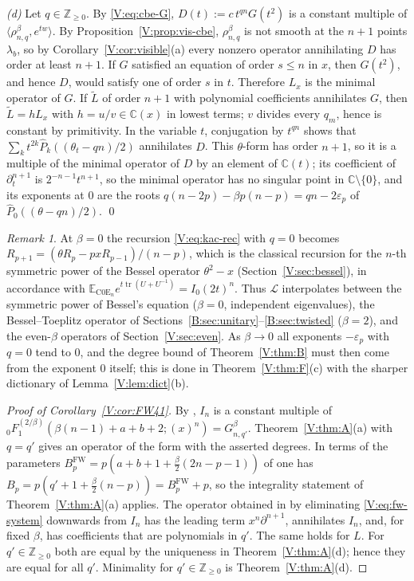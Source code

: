 \documentclass[11pt,a4paper]{article}
\theoremstyle{definition}
\theoremstyle{remark}
\newtheorem{remark}[theorem]{Remark}
\newcommand{\C}{\mathbb C}
\newcommand{\Z}{\mathbb Z}
\newcommand{\E}{\mathbb E}
\DeclareMathOperator{\tr}{tr}
\numberwithin{equation}{section}
\begin{document}
\emph{(d)} Let $q\in\Z_{\ge0}$. By \eqref{V:eq:cbe-G}, $D(t):=c\,t^{qn}G(t^2)$ is a constant multiple of $\langle\rho^\beta_{n,q},e^{tw}\rangle$. By Proposition~\ref{V:prop:vis-cbe}, $\rho^\beta_{n,q}$ is not smooth at the $n+1$ points $\lambda_b$, so by Corollary~\ref{V:cor:visible}(a) every nonzero operator annihilating $D$ has order at least $n+1$. If $G$ satisfied an equation of order $s\le n$ in $x$, then $G(t^2)$, and hence $D$, would satisfy one of order $s$ in $t$. Therefore $L_x$ is the minimal operator of $G$. If $\tilde L$ of order $n+1$ with polynomial coefficients annihilates $G$, then $\tilde L=hL_x$ with $h=u/v\in\C(x)$ in lowest terms; $v$ divides every $q_m$, hence is constant by primitivity. In the variable $t$, conjugation by $t^{qn}$ shows that $\sum_kt^{2k}\hat P_k((\theta_t-qn)/2)$ annihilates $D$. This $\theta$-form has order $n+1$, so it is a multiple of the minimal operator of $D$ by an element of $\C(t)$; its coefficient of $\partial_t^{n+1}$ is $2^{-n-1}t^{n+1}$, so the minimal operator has no singular point in $\C\setminus\{0\}$, and its exponents at $0$ are the roots $q(n-2p)-\beta p(n-p)=qn-2\varepsilon_p$ of $\hat P_0((\theta-qn)/2)$. \qed

\begin{remark}\label{V:rem:beta0}
At $\beta=0$ the recursion \eqref{V:eq:kac-rec} with $q=0$ becomes $R_{p+1}=(\theta R_p-pxR_{p-1})/(n-p)$, which is the classical recursion for the $n$-th symmetric power of the Bessel operator $\theta^2-x$ (Section~\ref{V:sec:bessel}), in accordance with $\E_{\mathrm{C}0\mathrm{E}_n}e^{t\tr(U+U^{-1})}=I_0(2t)^n$. Thus $\mathcal L$ interpolates between the symmetric power of Bessel's equation ($\beta=0$, independent eigenvalues), the Bessel--Toeplitz operator of Sections~\ref{B:sec:unitary}--\ref{B:sec:twisted} ($\beta=2$), and the even-$\beta$ operators of Section~\ref{V:sec:even}. As $\beta\to0$ all exponents $-\varepsilon_p$ with $q=0$ tend to $0$, and the degree bound of Theorem~\ref{V:thm:B} must then come from the exponent $0$ itself; this is done in Theorem~\ref{V:thm:F}(c) with the sharper dictionary of Lemma~\ref{V:lem:dict}(b).
\end{remark}

\begin{proof}[Proof of Corollary~\ref{V:cor:FW41}]
By \cite[(3.10)]{FW26}, $I_n$ is a constant multiple of ${}_0F_1^{(2/\beta)}(\beta(n-1)+a+b+2;(x)^n)=G^\beta_{n,q'}$. Theorem~\ref{V:thm:A}(a) with $q=q'$ gives an operator of the form \cite[(4.1)]{FW26} with the asserted degrees. In terms of the parameters $B^{\mathrm{FW}}_p=p(a+b+1+\frac\beta2(2n-p-1))$ of \cite[(3.3)]{FW26} one has $B_p=p(q'+1+\frac\beta2(n-p))=B^{\mathrm{FW}}_p+p$, so the integrality statement of Theorem~\ref{V:thm:A}(a) applies. The operator obtained in \cite[\S4.1]{FW26} by eliminating \eqref{V:eq:fw-system} downwards from $I_n$ has the leading term $x^n\partial^{n+1}$, annihilates $I_n$, and, for fixed $\beta$, has coefficients that are polynomials in $q'$. The same holds for $L$. For $q'\in\Z_{\ge0}$ both are equal by the uniqueness in Theorem~\ref{V:thm:A}(d); hence they are equal for all $q'$. Minimality for $q'\in\Z_{\ge0}$ is Theorem~\ref{V:thm:A}(d).
\end{proof}
\end{document}
